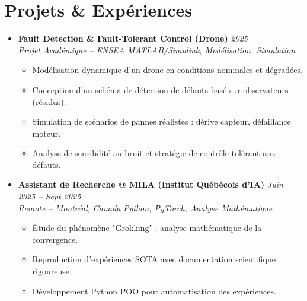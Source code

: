 \documentclass[a4paper,11pt]{article}
\begin{document}
\section{Projets \& Expériences}
\begin{itemize}[leftmargin=*, label={-}]

\item \textbf{Fault Detection \& Fault-Tolerant Control (Drone)} \hfill \textit{2025} \\
\textit{Projet Académique -- ENSEA} \hfill \textit{MATLAB/Simulink, Modélisation, Simulation}
\vspace{-2pt}
    \begin{itemize}[leftmargin=0.4cm, nosep, label=\tiny$\bullet$]
        \item \small{Modélisation dynamique d'un drone en conditions nominales et dégradées.}
        \item \small{Conception d'un schéma de détection de défauts basé sur observateurs (résidus).}
        \item \small{Simulation de scénarios de pannes réalistes : dérive capteur, défaillance moteur.}
        \item \small{Analyse de sensibilité au bruit et stratégie de contrôle tolérant aux défauts.}
    \end{itemize}
\vspace{3pt}

\item \textbf{Assistant de Recherche @ MILA (Institut Québécois d'IA)} \hfill \textit{Juin 2025 -- Sept 2025} \\
\textit{Remote -- Montréal, Canada} \hfill \textit{Python, PyTorch, Analyse Mathématique}
\vspace{-2pt}
    \begin{itemize}[leftmargin=0.4cm, nosep, label=\tiny$\bullet$]
        \item \small{Étude du phénomène "Grokking" : analyse mathématique de la convergence.}
        \item \small{Reproduction d'expériences SOTA avec documentation scientifique rigoureuse.}
        \item \small{Développement Python POO pour automatisation des expériences.}
    \end{itemize}
\vspace{3pt}


\end{itemize}
\end{document}
